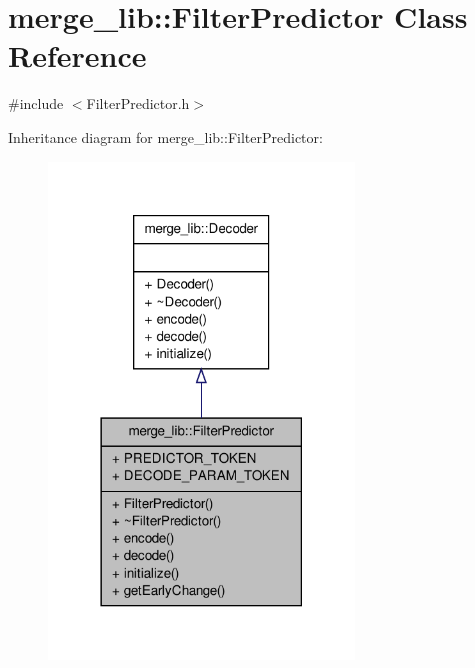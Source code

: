 \hypertarget{classmerge__lib_1_1_filter_predictor}{\section{merge\-\_\-lib\-:\-:Filter\-Predictor Class Reference}
\label{d5/d5f/classmerge__lib_1_1_filter_predictor}
}


{\ttfamily \#include $<$Filter\-Predictor.\-h$>$}



Inheritance diagram for merge\-\_\-lib\-:\-:Filter\-Predictor\-:
\nopagebreak
\begin{figure}[H]
\begin{center}
\leavevmode
\includegraphics[width=230pt]{d4/d51/classmerge__lib_1_1_filter_predictor__inherit__graph}
\end{center}
\end{figure}


